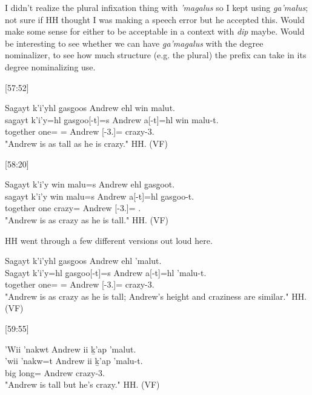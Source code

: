 I didn't realize the plural infixation thing with \textit{’mag̱alus} so I kept using \textit{g̱a’malus}; not sure if HH thought I was making a speech error but he accepted this. Would make some sense for either to be acceptable in a context with \textit{dip} maybe. Would be interesting to see whether we can have \textit{g̱a’mag̱alus} with the degree nominalizer, to see how much structure (e.g. the plural) the prefix can take in its degree nominalizing use.

[57:52]
\begin{exe}
    \ex \glll
    Sag̱ayt k’i’yhl g̱asg̱oos Andrew ehl win malut. \\
    sag̱ayt k’i’y=hl g̱asg̱oo[-t]=s Andrew a[-t]=hl win malu-t. \\
    together one=\Cn{} \Mass[-3.\Ii]=\Pn{} Andrew \Prep{}[-3.\Ii]=\Cn{} \Comp{} crazy-3.\Ii \\
    \glt "Andrew is as tall as he is crazy." \hfill HH.\ElicitationDate{} (VF)
\end{exe}

[58:20]
\begin{exe}
    \ex \glll
    Sag̱ayt k’i’y win malu=s Andrew ehl g̱asg̱oot. \\
    sag̱ayt k’i’y win malu=s Andrew a[-t]=hl g̱asg̱oo-t. \\
    together one \Comp{}   crazy=\Pn{} Andrew \Prep{}[-3.\Ii]=\Cn{} .\Ii \\    
    \glt "Andrew is as crazy as he is tall." \hfill HH.\ElicitationDate{} (VF)
\end{exe}

HH went through a few different versions out loud here. 

\begin{exe}
    \ex \glll
    Sag̱ayt k’i’yhl g̱asg̱oos Andrew ehl ’malut. \\
    Sag̱ayt k’i’y=hl g̱asg̱oo[-t]=s Andrew a[-t]=hl ’malu-t. \\
    together one=\Cn{} \Mass[-3.\Ii]=\Pn{} Andrew \Prep{}[-3.\Ii]=\Cn{} crazy-3.\Ii \\
    \glt "Andrew is as crazy as he is tall; Andrew's height and craziness are similar." \hfill HH.\ElicitationDate{} (VF)
\end{exe}

[59:55]
\begin{exe}
    \ex \glll
    ’Wii ’nakwt Andrew ii ḵ’ap ’malut. \\
    ’wii ’nakw=t Andrew ii ḵ’ap ’malu-t. \\
    big long=\Pn{} Andrew \Ccnj{} \Verum{} crazy-3.\Ii \\
    \glt "Andrew is tall but he's crazy." \hfill HH.\ElicitationDate{} (VF)
\end{exe}

